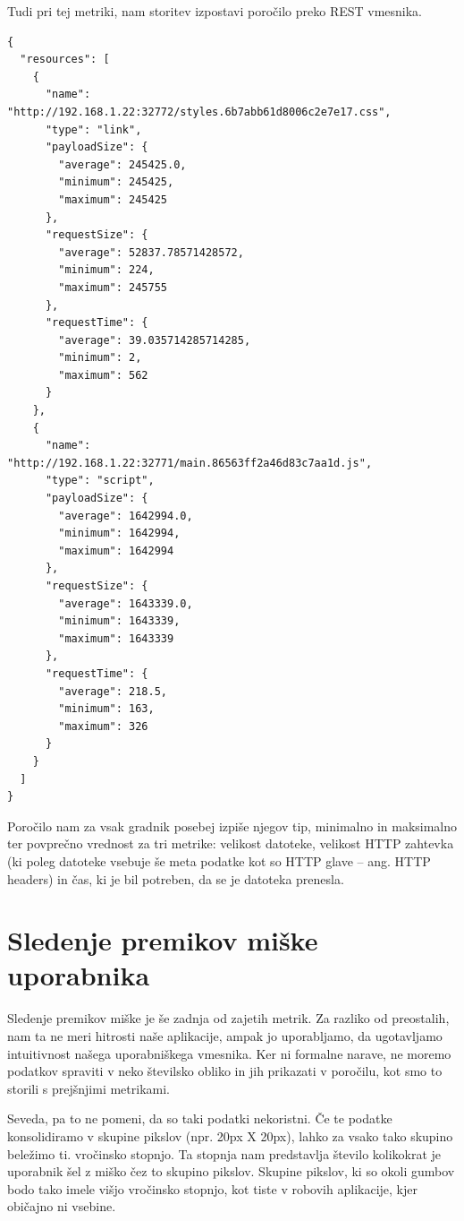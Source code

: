 \documentclass[a4paper, 12pt]{book}
\begin{document}
Tudi pri tej metriki, nam storitev izpostavi poročilo preko REST vmesnika.

\begin{lstlisting}[label=resource_load_report, caption=Poročilo časa nalaganja gradnikov strani]
{
  "resources": [
    {
      "name": "http://192.168.1.22:32772/styles.6b7abb61d8006c2e7e17.css",
      "type": "link",
      "payloadSize": {
        "average": 245425.0,
        "minimum": 245425,
        "maximum": 245425
      },
      "requestSize": {
        "average": 52837.78571428572,
        "minimum": 224,
        "maximum": 245755
      },
      "requestTime": {
        "average": 39.035714285714285,
        "minimum": 2,
        "maximum": 562
      }
    },
    {
      "name": "http://192.168.1.22:32771/main.86563ff2a46d83c7aa1d.js",
      "type": "script",
      "payloadSize": {
        "average": 1642994.0,
        "minimum": 1642994,
        "maximum": 1642994
      },
      "requestSize": {
        "average": 1643339.0,
        "minimum": 1643339,
        "maximum": 1643339
      },
      "requestTime": {
        "average": 218.5,
        "minimum": 163,
        "maximum": 326
      }
    }
  ]
}
\end{lstlisting}

Poročilo nam za vsak gradnik posebej izpiše njegov tip, minimalno in maksimalno ter povprečno vrednost za tri metrike: velikost datoteke, velikost HTTP zahtevka (ki poleg datoteke vsebuje še meta podatke kot so HTTP glave -- ang. HTTP headers) in čas, ki je bil potreben, da se je datoteka prenesla.

\section{Sledenje premikov miške uporabnika}
\label{ch2:sec4}

Sledenje premikov miške je še zadnja od zajetih metrik. Za razliko od preostalih, nam ta ne meri hitrosti naše aplikacije, ampak jo uporabljamo, da ugotavljamo intuitivnost našega uporabniškega vmesnika. Ker ni formalne narave, ne moremo podatkov spraviti v neko številsko obliko in jih prikazati v poročilu, kot smo to storili s prejšnjimi metrikami.

Seveda, pa to ne pomeni, da so taki podatki nekoristni. Če te podatke konsolidiramo v skupine pikslov (npr. 20px X 20px), lahko za vsako tako skupino beležimo ti. vročinsko stopnjo. Ta stopnja nam predstavlja število kolikokrat je uporabnik šel z miško čez to skupino pikslov. Skupine pikslov, ki so okoli gumbov bodo tako imele višjo vročinsko stopnjo, kot tiste v robovih aplikacije, kjer običajno ni vsebine.
\end{document}
